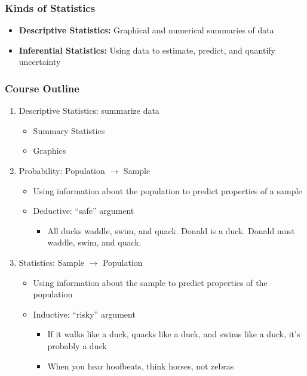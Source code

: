 \documentclass{beamer}
\begin{document}
\begin{frame}
\frametitle{Kinds of Statistics}
	\begin{itemize}
		\item \textbf{Descriptive Statistics:} Graphical and numerical summaries of data
		\item \textbf{Inferential Statistics:} Using data to estimate, predict, and quantify 					uncertainty
	\end{itemize}
\end{frame}

\begin{frame}
\frametitle{Course Outline}
	\begin{enumerate}
		\item Descriptive Statistics: summarize data
			\begin{itemize}
				\item Summary Statistics
				\item Graphics
			\end{itemize}
		\item Probability: Population $\rightarrow$ Sample
			\begin{itemize}
				\item Using information about the population to predict properties of a sample
				\item Deductive: ``safe'' argument
					\begin{itemize}
						\item All ducks waddle, swim, and quack. Donald is a duck. Donald must 								waddle, swim, and quack.
					\end{itemize}
			\end{itemize}
		\item Statistics: Sample $\rightarrow$ Population
			\begin{itemize}
				\item Using information about the sample to predict properties of the population
				\item Inductive: ``risky'' argument
					\begin{itemize}
						\item If it walks like a duck, quacks like a duck, and swims like a duck, it's 							probably a duck
						\item When you hear hoofbeats, think horses, not zebras
					\end{itemize}
			 \end{itemize}
	\end{enumerate}
\end{frame}
\end{document}
